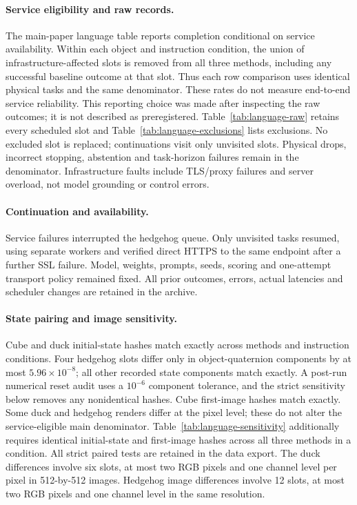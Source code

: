 \paragraph{Service eligibility and raw records.}
The main-paper language table reports completion conditional on service availability. Within each object and instruction condition, the union of infrastructure-affected slots is removed from all three methods, including any successful baseline outcome at that slot. Thus each row comparison uses identical physical tasks and the same denominator. These rates do not measure end-to-end service reliability. This reporting choice was made after inspecting the raw outcomes; it is not described as preregistered. Table~\ref{tab:language-raw} retains every scheduled slot and Table~\ref{tab:language-exclusions} lists exclusions. No excluded slot is replaced; continuations visit only unvisited slots. Physical drops, incorrect stopping, abstention and task-horizon failures remain in the denominator. Infrastructure faults include TLS/proxy failures and server overload, not model grounding or control errors.




\paragraph{Continuation and availability.}
Service failures interrupted the hedgehog queue. Only unvisited tasks resumed, using separate workers and verified direct HTTPS to the same endpoint after a further SSL failure. Model, weights, prompts, seeds, scoring and one-attempt transport policy remained fixed. All prior outcomes, errors, actual latencies and scheduler changes are retained in the archive.

\paragraph{State pairing and image sensitivity.}
Cube and duck initial-state hashes match exactly across methods and instruction conditions. Four hedgehog slots differ only in object-quaternion components by at most $5.96\times10^{-8}$; all other recorded state components match exactly. A post-run numerical reset audit uses a $10^{-6}$ component tolerance, and the strict sensitivity below removes any nonidentical hashes. Cube first-image hashes match exactly. Some duck and hedgehog renders differ at the pixel level; these do not alter the service-eligible main denominator. Table~\ref{tab:language-sensitivity} additionally requires identical initial-state and first-image hashes across all three methods in a condition. All strict paired tests are retained in the data export. The duck differences involve six slots, at most two RGB pixels and one channel level per pixel in 512-by-512 images. Hedgehog image differences involve 12 slots, at most two RGB pixels and one channel level in the same resolution.


